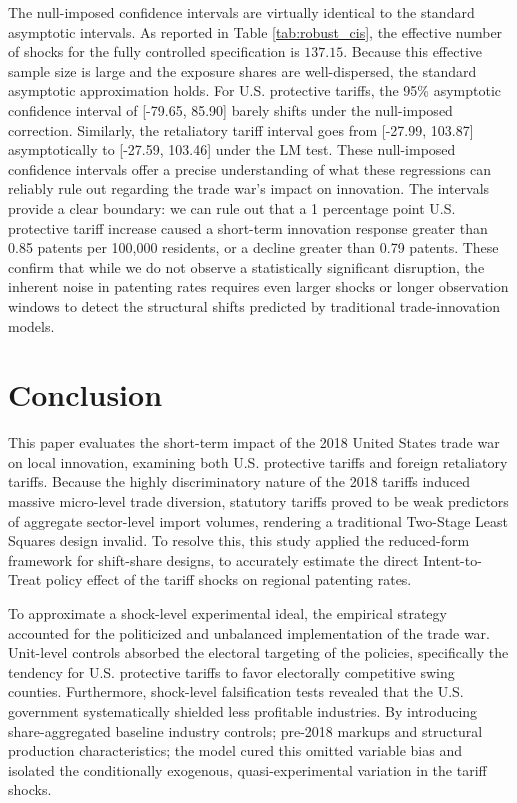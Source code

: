 \documentclass[12pt]{article}
\numberwithin{figure}{section}
\numberwithin{table}{section}
\begin{document}
The null-imposed confidence intervals are virtually identical to the standard asymptotic intervals. As reported in Table \ref{tab:robust_cis}, the effective number of shocks for the fully controlled specification is $137.15$. Because this effective sample size is large and the exposure shares are well-dispersed, the standard asymptotic approximation holds. For U.S. protective tariffs, the 95\% asymptotic confidence interval of [-79.65, 85.90] barely shifts under the null-imposed correction. Similarly, the retaliatory tariff interval goes from [-27.99, 103.87] asymptotically to [-27.59, 103.46] under the LM test. 
These null-imposed confidence intervals offer a precise understanding of what these regressions can reliably rule out regarding the trade war's impact on innovation. The intervals provide a clear boundary: we can rule out that a 1 percentage point U.S. protective tariff increase caused a short-term innovation response greater than 0.85 patents per 100,000 residents, or a decline greater than 0.79 patents. These confirm that while we do not observe a statistically significant disruption, the inherent noise in patenting rates requires even larger shocks or longer observation windows to detect the structural shifts predicted by traditional trade-innovation models.




\newpage
\section{Conclusion}

This paper evaluates the short-term impact of the 2018 United States trade war on local innovation, examining both U.S. protective tariffs and foreign retaliatory tariffs. Because the highly discriminatory nature of the 2018 tariffs induced massive micro-level trade diversion, statutory tariffs proved to be weak predictors of aggregate sector-level import volumes, rendering a traditional Two-Stage Least Squares design invalid. To resolve this, this study applied the reduced-form \cite{BHJ2022} framework for shift-share designs, to accurately estimate the direct Intent-to-Treat policy effect of the tariff shocks on regional patenting rates. 

To approximate a shock-level experimental ideal, the empirical strategy accounted for the politicized and unbalanced implementation of the trade war. Unit-level controls absorbed the electoral targeting of the policies, specifically the tendency for U.S. protective tariffs to favor electorally competitive swing counties. Furthermore, shock-level falsification tests revealed that the U.S. government systematically shielded less profitable industries. By introducing share-aggregated baseline industry controls; pre-2018 markups and structural production characteristics; the model cured this omitted variable bias and isolated the conditionally exogenous, quasi-experimental variation in the tariff shocks. 
\end{document}
